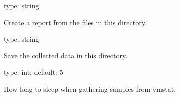 \documentclass[letterpaper,10pt,english]{sphinxmanual}
\begin{document}
\begin{fulllineitems}
\label{\detokenize{mariadb-summary:cmdoption-mariadb-summary-read-samples}}
\sphinxAtStartPar
type: string

\sphinxAtStartPar
Create a report from the files in this directory.

\end{fulllineitems}


\begin{fulllineitems}
\label{\detokenize{mariadb-summary:cmdoption-mariadb-summary-save-samples}}
\sphinxAtStartPar
type: string

\sphinxAtStartPar
Save the collected data in this directory.

\end{fulllineitems}


\begin{fulllineitems}
\label{\detokenize{mariadb-summary:cmdoption-mariadb-summary-sleep}}
\sphinxAtStartPar
type: int; default: 5

\sphinxAtStartPar
How long to sleep when gathering samples from vmstat.

\end{fulllineitems}
\end{document}

